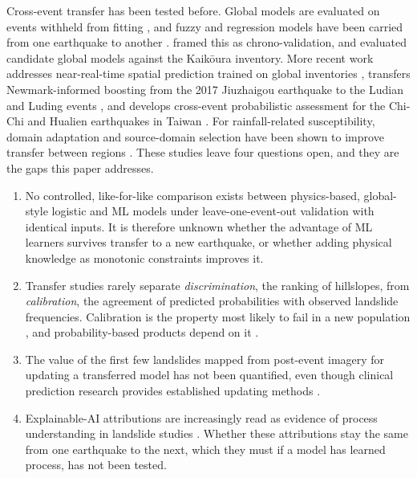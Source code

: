Cross-event transfer has been tested before. Global models are evaluated on events withheld from fitting \citep{nowicki2014,nowickijessee2018,tanyas2019slope}, and fuzzy and regression models have been carried from one earthquake to another \citep{kritikos2015,li2013lushan}. \citet{lombardo2020chrono} framed this as chrono-validation, and \citet{allstadt2018} evaluated candidate global models against the Kaik\={o}ura inventory. More recent work addresses near-real-time spatial prediction trained on global inventories \citep{zhang2024nearrealtime}, transfers Newmark-informed boosting from the 2017 Jiuzhaigou earthquake to the Ludian and Luding events \citep{zhang2025newmarkxgboost}, and develops cross-event probabilistic assessment for the Chi-Chi and Hualien earthquakes in Taiwan \citep{ma2026crossevent}. For rainfall-related susceptibility, domain adaptation and source-domain selection have been shown to improve transfer between regions \citep{wang2022transfer,su2025multisource,wang2026crossregional,wang2026regionsimilarity}. These studies leave four questions open, and they are the gaps this paper addresses.

\begin{enumerate}
\item No controlled, like-for-like comparison exists between physics-based, global-style logistic and ML models under leave-one-event-out validation with identical inputs. It is therefore unknown whether the advantage of ML learners survives transfer to a new earthquake, or whether adding physical knowledge as monotonic constraints \citep{karpatne2017,reichstein2019} improves it.
\item Transfer studies rarely separate \emph{discrimination}, the ranking of hillslopes, from \emph{calibration}, the agreement of predicted probabilities with observed landslide frequencies. Calibration is the property most likely to fail in a new population \citep{vancalster2019}, and probability-based products depend on it \citep{allstadt2022}.
\item The value of the first few landslides mapped from post-event imagery \citep{williams2018,handwerger2022} for updating a transferred model has not been quantified, even though clinical prediction research provides established updating methods \citep{steyerberg2004,janssen2008}.
\item Explainable-AI attributions \citep{lundberg2017,lundberg2020} are increasingly read as evidence of process understanding in landslide studies \citep{dahal2023xai}. Whether these attributions stay the same from one earthquake to the next, which they must if a model has learned process, has not been tested.
\end{enumerate}

